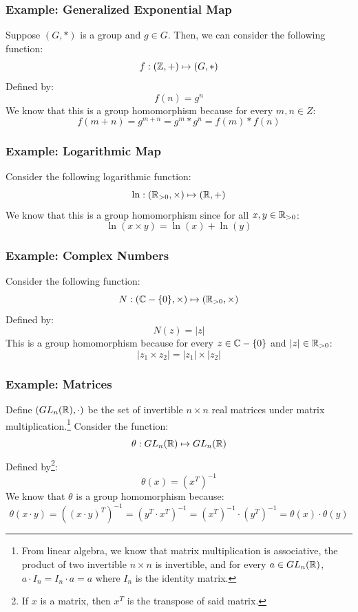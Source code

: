 \documentclass[letterpaper]{article}
\begin{document}
\subsubsection{Example: Generalized Exponential Map}
Suppose $(G, *)$ is a group and $g \in G$. Then, we can consider the following function: 
\[f: (\mathbb{Z}, +) \mapsto (G, *)\]
Defined by: 
\[f(n) = g^n\]
We know that this is a group homomorphism because for every $m, n \in Z$:
\[f(m + n) = g^{m + n} = g^m * g^n = f(m) * f(n)\]

\subsubsection{Example: Logarithmic Map}
Consider the following logarithmic function: 
\[\ln: (\mathbb{R}_{> 0}, \times) \mapsto (\mathbb{R}, +)\]
We know that this is a group homomorphism since for all $x, y \in \mathbb{R}_{ > 0}$: 
\[\ln(x \times y) = \ln(x) + \ln(y)\]

\subsubsection{Example: Complex Numbers}
Consider the following function: 
\[N: (\mathbb{C} - \{0\}, \times) \mapsto (\mathbb{R}_{> 0}, \times)\]
Defined by: 
\[N(z) = |z|\]
This is a group homomorphism because for every $z \in \mathbb{C} - \{0\}$ and $|z| \in \mathbb{R}_{> 0}$:
\[|z_1 \times z_2| = |z_1| \times |z_2|\]

\subsubsection{Example: Matrices}
Define $(GL_{n}(\mathbb{R}), \cdot)$ be the set of invertible $n \times n$ real matrices under matrix multiplication.\footnote{From linear algebra, we know that matrix multiplication is associative, the product of two invertible $n \times n$ is invertible, and for every $a \in GL_{n}(\mathbb{R})$, $a \cdot I_n = I_n \cdot a = a$ where $I_n$ is the identity matrix.} Consider the function: 
\[\theta: GL_{n}(\mathbb{R}) \mapsto GL_{n}(\mathbb{R})\]
Defined by\footnote{If $x$ is a matrix, then $x^T$ is the transpose of said matrix.}: 
\[\theta(x) = (x^T)^{-1}\]
We know that $\theta$ is a group homomorphism because: 
\[\theta(x \cdot y) = ((x \cdot y)^T)^{-1} = (y^T \cdot x^T)^{-1} = (x^T)^{-1} \cdot (y^T)^{-1} = \theta(x) \cdot \theta(y)\]
\end{document}
